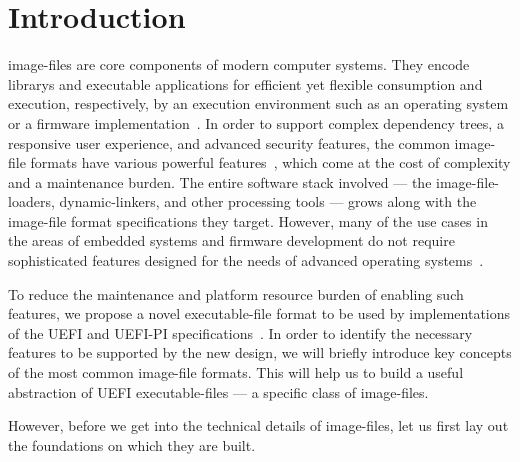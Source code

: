 
\newtheorem{requirement}{Requirement}

\chapter{Introduction} %

\Glspl{image-file} are core components of modern computer systems. They encode \glspl{library} and executable applications for efficient yet flexible consumption and execution, respectively, by an execution environment such as an operating system or a \gls{firmware} implementation~\cite{os-concepts,pi-spec,uefi-spec}. In order to support complex dependency trees, a responsive user experience, and advanced security features, the common \gls{image-file} formats have various powerful features~\cite{elf-spec,macho-spec,pe-format}, which come at the cost of complexity and a maintenance burden. The entire software stack involved --- the \glspl{image-file-loader}, \glspl{dynamic-linker}, and other processing tools --- grows along with the \gls{image-file} format specifications they target. However, many of the use cases in the areas of embedded systems and \gls{firmware} development do not require sophisticated features designed for the needs of advanced operating systems~\cite{pi-spec,uefi-spec}.

To reduce the maintenance and platform resource burden of enabling such features, we propose a novel \gls{executable-file} format to be used by implementations of the \gls{UEFI} and \gls{UEFI-PI} specifications~\cite{pi-spec,uefi-spec}. In order to identify the necessary features to be supported by the new design, we will briefly introduce key concepts of the most common \gls{image-file} formats. This will help us to build a useful abstraction of \gls{UEFI} \glspl{executable-file} --- a specific class of \glspl{image-file}.

However, before we get into the technical details of \glspl{image-file}, let us first lay out the foundations on which they are built.

